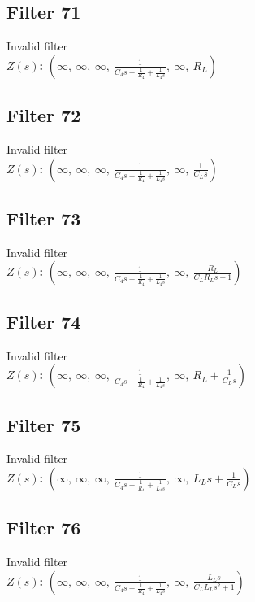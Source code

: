 \documentclass{article}
\begin{document}
\subsection*{Filter 71}
Invalid filter \\ 
\textbf{$Z(s)$:} $\left( \infty, \  \infty, \  \infty, \  \frac{1}{C_{4} s + \frac{1}{R_{4}} + \frac{1}{L_{4} s}}, \  \infty, \  R_{L}\right)$ \\ 
\subsection*{Filter 72}
Invalid filter \\ 
\textbf{$Z(s)$:} $\left( \infty, \  \infty, \  \infty, \  \frac{1}{C_{4} s + \frac{1}{R_{4}} + \frac{1}{L_{4} s}}, \  \infty, \  \frac{1}{C_{L} s}\right)$ \\ 
\subsection*{Filter 73}
Invalid filter \\ 
\textbf{$Z(s)$:} $\left( \infty, \  \infty, \  \infty, \  \frac{1}{C_{4} s + \frac{1}{R_{4}} + \frac{1}{L_{4} s}}, \  \infty, \  \frac{R_{L}}{C_{L} R_{L} s + 1}\right)$ \\ 
\subsection*{Filter 74}
Invalid filter \\ 
\textbf{$Z(s)$:} $\left( \infty, \  \infty, \  \infty, \  \frac{1}{C_{4} s + \frac{1}{R_{4}} + \frac{1}{L_{4} s}}, \  \infty, \  R_{L} + \frac{1}{C_{L} s}\right)$ \\ 
\subsection*{Filter 75}
Invalid filter \\ 
\textbf{$Z(s)$:} $\left( \infty, \  \infty, \  \infty, \  \frac{1}{C_{4} s + \frac{1}{R_{4}} + \frac{1}{L_{4} s}}, \  \infty, \  L_{L} s + \frac{1}{C_{L} s}\right)$ \\ 
\subsection*{Filter 76}
Invalid filter \\ 
\textbf{$Z(s)$:} $\left( \infty, \  \infty, \  \infty, \  \frac{1}{C_{4} s + \frac{1}{R_{4}} + \frac{1}{L_{4} s}}, \  \infty, \  \frac{L_{L} s}{C_{L} L_{L} s^{2} + 1}\right)$ \\ 
\end{document}

